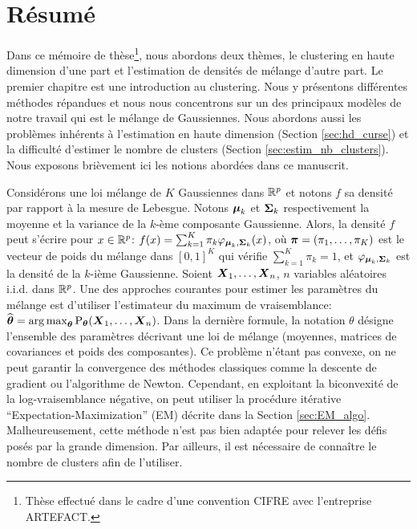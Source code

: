 \chapter*{Résumé}

Dans ce mémoire de thèse\footnote{Thèse effectué dans le cadre d'une convention CIFRE avec l'entreprise ARTEFACT.}, nous abordons deux thèmes, le clustering en haute dimension d'une part et l'estimation de densités de mélange d'autre part. Le premier chapitre est une introduction au clustering. Nous y présentons différentes méthodes répandues et nous nous concentrons sur un des principaux modèles de notre travail qui est le mélange de Gaussiennes. Nous abordons aussi les problèmes inhérents à l'estimation en haute dimension (Section \ref{sec:hd_curse}) et la difficulté d'estimer le nombre de clusters (Section \ref{sec:estim_nb_clusters}).  Nous exposons brièvement ici les notions abordées dans ce manuscrit. 

Considérons une loi mélange de $K$ Gaussiennes dans ${\mathbb R}^p$ et notons $f$ sa densité par rapport à la mesure de Lebesgue. Notons $\boldsymbol\mu_k$ et $\boldsymbol\Sigma_k$ respectivement la moyenne et la variance de la $k$-ème composante Gaussienne. Alors, la densité $f$ peut s'écrire pour $x\in{\mathbb R}^p$: $f(x)= \sum_{k=1}^K\pi_k\varphi_{\boldsymbol\mu_k,\boldsymbol\Sigma_k}(x)$, où $\boldsymbol \pi=(\pi_1,\dots,\pi_K)$ est le vecteur de poids du mélange dans $[0,1]^K$ qui vérifie $\sum_{k=1}^K\pi_k=1$, et $\varphi_{\boldsymbol\mu_k,\boldsymbol\Sigma_k}$ est la densité de la $k$-ième Gaussienne. Soient $\boldsymbol X_1,\dots,\boldsymbol X_n$, $n$ variables aléatoires i.i.d. dans ${\mathbb R}^p$. Une des approches courantes pour estimer les paramètres du mélange est d'utiliser l'estimateur du maximum de vraisemblance: $\widehat{{\boldsymbol\theta}} = \operatorname*{arg\,max}_{{\boldsymbol\theta}}\textnormal{P}_{{\boldsymbol\theta}}(\boldsymbol X_1,\dots,\boldsymbol X_n)$. Dans la dernière formule, la notation $\theta$ désigne l'ensemble des paramètres décrivant une loi de mélange (moyennes, matrices de covariances et poids des composantes). Ce problème n'étant pas convexe, on ne peut garantir la convergence des méthodes classiques comme la descente de gradient ou l'algorithme de Newton. Cependant, en exploitant la biconvexité de la log-vraisemblance négative, on peut utiliser la procédure itérative ``Expectation-Maximization'' (EM) décrite dans la Section \ref{sec:EM_algo}. Malheureusement, cette méthode n'est pas bien adaptée pour relever les défis posés par la grande dimension. Par ailleurs, il est nécessaire de connaître le nombre de clusters afin de l'utiliser.

